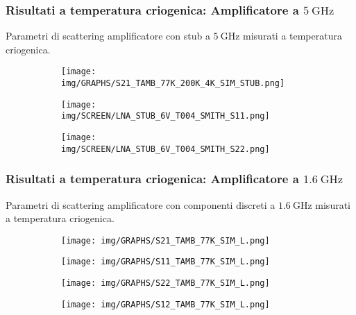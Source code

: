 \documentclass{beamer}
\begin{document}
\begin{frame}
    \frametitle{Risultati a temperatura criogenica: Amplificatore a $\SI{5}{\giga\hertz}$}
    Parametri di scattering amplificatore con stub a $\SI{5}{\giga\hertz}$ misurati a temperatura criogenica.
    \begin{figure}[!htbp]
        \centering
        \begin{subfigure}[t]{0.4\textwidth}
            \centering
            \texttt{[image: img/GRAPHS/S21\_TAMB\_77K\_200K\_4K\_SIM\_STUB.png]}
            
        \end{subfigure}
        \hfill
        \begin{subfigure}[t]{0.4\textwidth}
            \centering
            \texttt{[image: img/SCREEN/LNA\_STUB\_6V\_T004\_SMITH\_S11.png]}
            
        \end{subfigure}
        \hfill
        \centering
        \begin{subfigure}[t]{0.4\textwidth}
            \centering
            \texttt{[image: img/SCREEN/LNA\_STUB\_6V\_T004\_SMITH\_S22.png]}
            
        \end{subfigure}            
    \end{figure}
\end{frame}

\begin{frame}
    \frametitle{Risultati a temperatura criogenica: Amplificatore a $\SI{1.6}{\giga\hertz}$}
    Parametri di scattering amplificatore con componenti discreti a $\SI{1.6}{\giga\hertz}$ misurati a temperatura criogenica.
    \begin{figure}[!htbp]
        \centering
        \begin{subfigure}[t]{0.4\textwidth}
            \centering
            \texttt{[image: img/GRAPHS/S21\_TAMB\_77K\_SIM\_L.png]}
            
        \end{subfigure}
        \hfill
        \begin{subfigure}[t]{0.4\textwidth}
            \centering
            \texttt{[image: img/GRAPHS/S11\_TAMB\_77K\_SIM\_L.png]}
            
        \end{subfigure}   
        \begin{subfigure}[t]{0.4\textwidth}
            \centering
            \texttt{[image: img/GRAPHS/S22\_TAMB\_77K\_SIM\_L.png]}
            
        \end{subfigure} 
        \begin{subfigure}[t]{0.4\textwidth}
            \centering
            \texttt{[image: img/GRAPHS/S12\_TAMB\_77K\_SIM\_L.png]}
            
        \end{subfigure}        

    \end{figure}
\end{frame}
\end{document}

